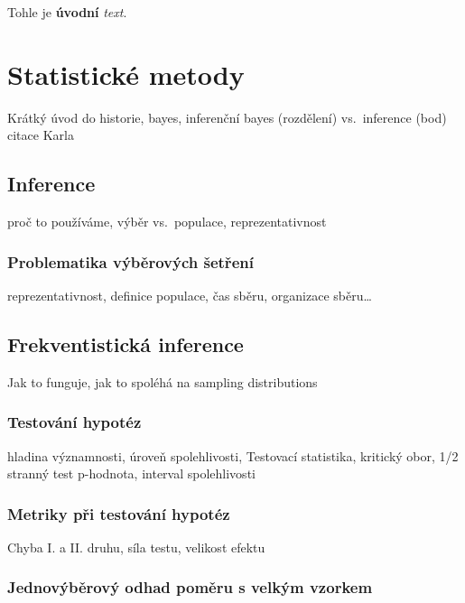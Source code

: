 \documentclass[
  11pt,
  a4paper]{report}
\begin{document}
Tohle je \textbf{úvodní} \emph{text}.

\chapter{Statistické metody}\label{statistickuxe9-metody}

Krátký úvod do historie, bayes, inferenční bayes (rozdělení)
vs.~inference (bod) citace Karla

\section{Inference}\label{inference}

proč to používáme, výběr vs.~populace, reprezentativnost

\subsection{Problematika výběrových
šetření}\label{problematika-vuxfdbux11brovuxfdch-ux161etux159enuxed}

reprezentativnost, definice populace, čas sběru, organizace
sběru\ldots{}

\section{Frekventistická inference}\label{frekventistickuxe1-inference}

Jak to funguje, jak to spoléhá na sampling distributions

\subsection{Testování hypotéz}\label{testovuxe1nuxed-hypotuxe9z}

hladina významnosti, úroveň spolehlivosti, Testovací statistika,
kritický obor, 1/2 stranný test p-hodnota, interval spolehlivosti

\subsection{Metriky při testování
hypotéz}\label{metriky-pux159i-testovuxe1nuxed-hypotuxe9z}

Chyba I. a II. druhu, síla testu, velikost efektu

\subsection{Jednovýběrový odhad poměru s velkým
vzorkem}\label{jednovuxfdbux11brovuxfd-odhad-pomux11bru-s-velkuxfdm-vzorkem}
\end{document}
